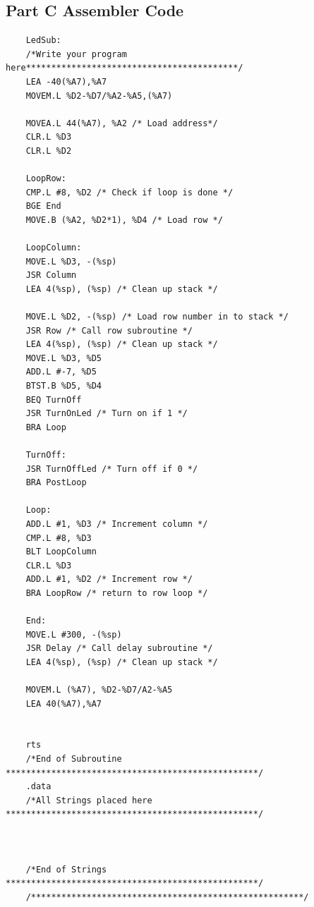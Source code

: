 \documentclass[10pt, letterpaper, titlepage]{article} %
\begin{document}
\subsection{Part C Assembler Code}

\begin{lstlisting}
	LedSub:
	/*Write your program here******************************************/
	LEA -40(%A7),%A7
	MOVEM.L %D2-%D7/%A2-%A5,(%A7)
	
	MOVEA.L 44(%A7), %A2 /* Load address*/
	CLR.L %D3
	CLR.L %D2
	
	LoopRow:
	CMP.L #8, %D2 /* Check if loop is done */
	BGE End
	MOVE.B (%A2, %D2*1), %D4 /* Load row */
	
	LoopColumn:
	MOVE.L %D3, -(%sp)
	JSR Column
	LEA 4(%sp), (%sp) /* Clean up stack */
	
	MOVE.L %D2, -(%sp) /* Load row number in to stack */
	JSR Row /* Call row subroutine */
	LEA 4(%sp), (%sp) /* Clean up stack */
	MOVE.L %D3, %D5
	ADD.L #-7, %D5
	BTST.B %D5, %D4
	BEQ TurnOff
	JSR TurnOnLed /* Turn on if 1 */
	BRA Loop
	
	TurnOff:
	JSR TurnOffLed /* Turn off if 0 */
	BRA PostLoop
	
	Loop:
	ADD.L #1, %D3 /* Increment column */
	CMP.L #8, %D3
	BLT LoopColumn
	CLR.L %D3
	ADD.L #1, %D2 /* Increment row */
	BRA LoopRow /* return to row loop */
	
	End:
	MOVE.L #300, -(%sp)
	JSR Delay /* Call delay subroutine */
	LEA 4(%sp), (%sp) /* Clean up stack */
	
	MOVEM.L (%A7), %D2-%D7/A2-%A5
	LEA 40(%A7),%A7
	
	
	rts
	/*End of Subroutine **************************************************/
	.data
	/*All Strings placed here **************************************************/
	
	
	
	/*End of Strings **************************************************/
	/******************************************************/
\end{lstlisting}
\end{document}
